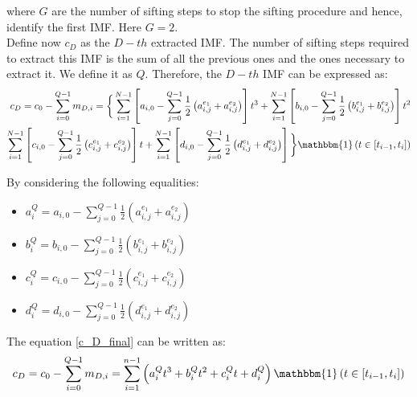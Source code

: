 where $G$ are the number of sifting steps to stop the sifting procedure and hence, identify the first IMF. Here $G=2$.\\ 
Define now $c_D$ as the $D-th$ extracted IMF. The number of sifting steps required to extract this IMF is the sum of all the previous ones and the ones necessary to extract it.  We define it as $Q$. Therefore, the $D-th$ IMF can be expressed as:
\begin{equation}
\label{c_D_final}
\begin{split}
c_D = c_0 - \sum_{i=0}^{Q-1} m_{D,i} = \bigg\{ \sum_{i=1}^{N-1} \left[ a_{i,0} - \sum_{j=0}^{Q-1} \frac{1}{2} \left( a_{i,j}^{e_1} + a_{i,j}^{e_2} \right) \right]t^3 + \sum_{i=1}^{N-1} \left[ b_{i,0} - \sum_{j=0}^{Q-1} \frac{1}{2} \left( b_{i,j}^{e_1} + b_{i,j}^{e_2} \right) \right] t^2 \\
\sum_{i=1}^{N-1} \left[ c_{i,0} - \sum_{j=0}^{Q-1} \frac{1}{2} \left( c_{i,j}^{e_1} + c_{i,j}^{e_2} \right) \right] t  + \sum_{i=1}^{N-1} \left[ d_{i,0} - \sum_{j=0}^{Q-1} \frac{1}{2} \left( d_{i,j}^{e_1} + d_{i,j}^{e_2} \right) \right] \bigg\} \mathbbm{1} \left( t \in \left[ t_{i-1}, t_i \right] \right)
\end{split}
\end{equation} 

By considering the following equalities:

\begin{multicols}{2}
\begin{itemize}
\item $a_i^Q = a_{i,0} - \sum_{j=0}^{Q-1} \frac{1}{2} \left( a_{i,j}^{e_1} + a_{i,j}^{e_2} \right) $
\item $b_i^Q = b_{i,0} - \sum_{j=0}^{Q-1} \frac{1}{2} \left( b_{i,j}^{e_1} + b_{i,j}^{e_2} \right)$
\item $c_i^Q =  c_{i,0} - \sum_{j=0}^{Q-1} \frac{1}{2} \left( c_{i,j}^{e_1} + c_{i,j}^{e_2} \right)$
\item $d_i^Q =  d_{i,0} - \sum_{j=0}^{Q-1} \frac{1}{2} \left( d_{i,j}^{e_1} + d_{i,j}^{e_2} \right)$

\end{itemize}
\end{multicols}

The equation \ref{c_D_final} can be written as:
\begin{equation}
c_D = c_0 - \sum_{i=0}^{Q-1} m_{D,i} = \sum_{i=1}^{n-1} \left( a_i^Q t^3 + b_i^Q t^2 + c_i^Q t + d_i^Q \right) \mathbbm{1} \left( t \in \left[ t_{i-1}, t_i \right] \right)
\end{equation}